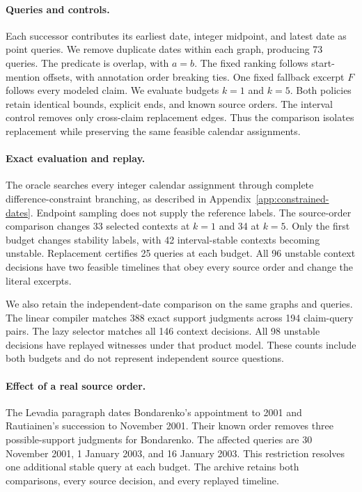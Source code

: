 \paragraph{Queries and controls.}
Each successor contributes its earliest date, integer midpoint, and latest date as point queries.
We remove duplicate dates within each graph, producing 73 queries.
The predicate is overlap, with $a=b$.
The fixed ranking follows start-mention offsets, with annotation order breaking ties.
One fixed fallback excerpt $F$ follows every modeled claim.
We evaluate budgets $k=1$ and $k=5$.
Both policies retain identical bounds, explicit ends, and known source orders.
The interval control removes only cross-claim replacement edges.
Thus the comparison isolates replacement while preserving the same feasible calendar assignments.

\paragraph{Exact evaluation and replay.}
The oracle searches every integer calendar assignment through complete difference-constraint branching, as described in Appendix~\ref{app:constrained-dates}.
Endpoint sampling does not supply the reference labels.
The source-order comparison changes 33 selected contexts at $k=1$ and 34 at $k=5$.
Only the first budget changes stability labels, with 42 interval-stable contexts becoming unstable.
Replacement certifies 25 queries at each budget.
All 96 unstable context decisions have two feasible timelines that obey every source order and change the literal excerpts.

We also retain the independent-date comparison on the same graphs and queries.
The linear compiler matches 388 exact support judgments across 194 claim-query pairs.
The lazy selector matches all 146 context decisions.
All 98 unstable decisions have replayed witnesses under that product model.
These counts include both budgets and do not represent independent source questions.

\paragraph{Effect of a real source order.}
The Levadia paragraph dates Bondarenko's appointment to 2001 and Rautiainen's succession to November 2001.
Their known order removes three possible-support judgments for Bondarenko.
The affected queries are 30 November 2001, 1 January 2003, and 16 January 2003.
This restriction resolves one additional stable query at each budget.
The archive retains both comparisons, every source decision, and every replayed timeline.
